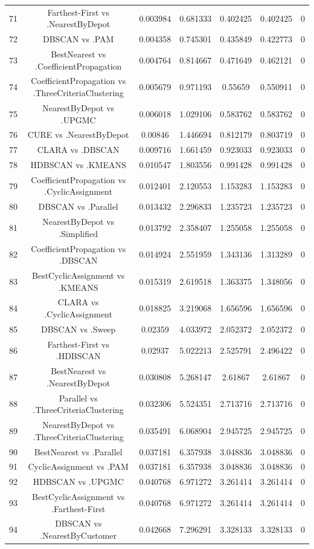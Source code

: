 \documentclass[a4paper,10pt]{article}
\begin{document}
\begin{landscape}
\begin{table}[!htp]
\begin{tabular}{ccccccc}
71&Farthest-First vs .NearestByDepot&0.003984&0.681333&0.402425&0.402425&0\\
72&DBSCAN vs .PAM&0.004358&0.745301&0.435849&0.422773&0\\
73&BestNearest vs .CoefficientPropagation&0.004764&0.814667&0.471649&0.462121&0\\
74&CoefficientPropagation vs .ThreeCriteriaClustering&0.005679&0.971193&0.55659&0.550911&0\\
75&NearestByDepot vs .UPGMC&0.006018&1.029106&0.583762&0.583762&0\\
76&CURE vs .NearestByDepot&0.00846&1.446694&0.812179&0.803719&0\\
77&CLARA vs .DBSCAN&0.009716&1.661459&0.923033&0.923033&0\\
78&HDBSCAN vs .KMEANS&0.010547&1.803556&0.991428&0.991428&0\\
79&CoefficientPropagation vs .CyclicAssignment&0.012401&2.120553&1.153283&1.153283&0\\
80&DBSCAN vs .Parallel&0.013432&2.296833&1.235723&1.235723&0\\
81&NearestByDepot vs .Simplified&0.013792&2.358407&1.255058&1.255058&0\\
82&CoefficientPropagation vs .DBSCAN&0.014924&2.551959&1.343136&1.313289&0\\
83&BestCyclicAssignment vs .KMEANS&0.015319&2.619518&1.363375&1.348056&0\\
84&CLARA vs .CyclicAssignment&0.018825&3.219068&1.656596&1.656596&0\\
85&DBSCAN vs .Sweep&0.02359&4.033972&2.052372&2.052372&0\\
86&Farthest-First vs .HDBSCAN&0.02937&5.022213&2.525791&2.496422&0\\
87&BestNearest vs .NearestByDepot&0.030808&5.268147&2.61867&2.61867&0\\
88&Parallel vs .ThreeCriteriaClustering&0.032306&5.524351&2.713716&2.713716&0\\
89&NearestByDepot vs .ThreeCriteriaClustering&0.035491&6.068904&2.945725&2.945725&0\\
90&BestNearest vs .Parallel&0.037181&6.357938&3.048836&3.048836&0\\
91&CyclicAssignment vs .PAM&0.037181&6.357938&3.048836&3.048836&0\\
92&HDBSCAN vs .UPGMC&0.040768&6.971272&3.261414&3.261414&0\\
93&BestCyclicAssignment vs .Farthest-First&0.040768&6.971272&3.261414&3.261414&0\\
94&DBSCAN vs .NearestByCustomer&0.042668&7.296291&3.328133&3.328133&0\\

\end{tabular}
\end{table}
\end{landscape}
\end{document}
